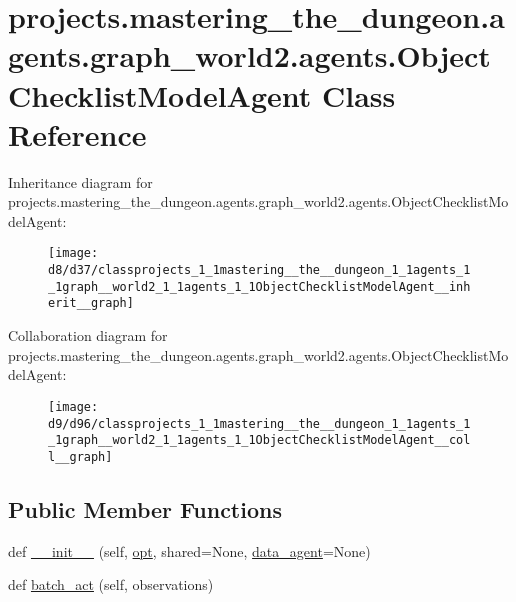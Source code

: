 \hypertarget{classprojects_1_1mastering__the__dungeon_1_1agents_1_1graph__world2_1_1agents_1_1ObjectChecklistModelAgent}{}\section{projects.\+mastering\+\_\+the\+\_\+dungeon.\+agents.\+graph\+\_\+world2.\+agents.\+Object\+Checklist\+Model\+Agent Class Reference}
\label{classprojects_1_1mastering__the__dungeon_1_1agents_1_1graph__world2_1_1agents_1_1ObjectChecklistModelAgent}


Inheritance diagram for projects.\+mastering\+\_\+the\+\_\+dungeon.\+agents.\+graph\+\_\+world2.\+agents.\+Object\+Checklist\+Model\+Agent\+:
\nopagebreak
\begin{figure}[H]
\begin{center}
\leavevmode
\texttt{[image: d8/d37/classprojects\_1\_1mastering\_\_the\_\_dungeon\_1\_1agents\_1\_1graph\_\_world2\_1\_1agents\_1\_1ObjectChecklistModelAgent\_\_inherit\_\_graph]}
\end{center}
\end{figure}


Collaboration diagram for projects.\+mastering\+\_\+the\+\_\+dungeon.\+agents.\+graph\+\_\+world2.\+agents.\+Object\+Checklist\+Model\+Agent\+:
\nopagebreak
\begin{figure}[H]
\begin{center}
\leavevmode
\texttt{[image: d9/d96/classprojects\_1\_1mastering\_\_the\_\_dungeon\_1\_1agents\_1\_1graph\_\_world2\_1\_1agents\_1\_1ObjectChecklistModelAgent\_\_coll\_\_graph]}
\end{center}
\end{figure}
\subsection*{Public Member Functions}
\begin{DoxyCompactItemize}
\item 
def \hyperlink{classprojects_1_1mastering__the__dungeon_1_1agents_1_1graph__world2_1_1agents_1_1ObjectChecklistModelAgent_aa54d6ccd6b88786071d941fa4ba2a1dc}{\+\_\+\+\_\+init\+\_\+\+\_\+} (self, \hyperlink{classparlai_1_1core_1_1agents_1_1Agent_ab3b45d2754244608c75d4068b90cd051}{opt}, shared=None, \hyperlink{classprojects_1_1mastering__the__dungeon_1_1agents_1_1graph__world2_1_1agents_1_1ModelAgentBase_a229b7901e20dced7e3b3c3e2d381d2ce}{data\+\_\+agent}=None)
\item 
def \hyperlink{classprojects_1_1mastering__the__dungeon_1_1agents_1_1graph__world2_1_1agents_1_1ObjectChecklistModelAgent_ac00137901ca02a46981f5f336118cc57}{batch\+\_\+act} (self, observations)
\end{DoxyCompactItemize}
